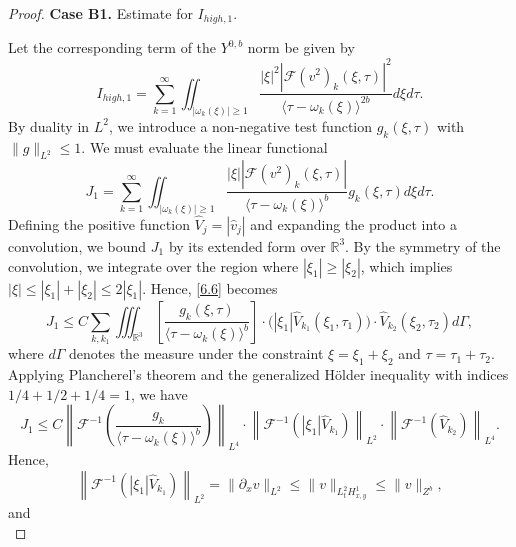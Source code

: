 \documentclass[11pt]{article}
\numberwithin{equation}{section}
\begin{document}
\begin{proof}
\textbf{Case B1.} Estimate for $I_{high,1}$.

Let the corresponding term of the $Y^{0,b}$ norm be given by
\begin{equation}
    I_{high,1} = \sum_{k=1}^{\infty} \iint_{|\omega_{k}(\xi)| \ge 1} \frac{|\xi|^{2}
    |\mathcal{F}(v^{2})_{k}(\xi,\tau)|^{2}}{\langle \tau - \omega_{k}(\xi)\rangle^{2b}} d\xi d\tau.
\end{equation}
By duality in $L^2$, we introduce a non-negative test function $g_{k}(\xi,\tau)$ with $\|g\|_{L^2} \le 1$.
We must evaluate the linear functional
\begin{equation}\label{6.6}
    J_{1} = \sum_{k=1}^{\infty} \iint_{|\omega_{k}(\xi)|\geq 1} \frac{|\xi| |\mathcal{F}(v^{2})_k(\xi,\tau)|}{\langle \tau
    - \omega_{k}(\xi)\rangle^{b}} g_{k}(\xi,\tau) d\xi d\tau.
\end{equation}
Defining the positive function $\widehat{V}_{j} = |\widehat{v}_{j}|$
and expanding the product into a convolution, we bound $J_{1}$ by
its extended form over $\mathbb{R}^{3}$. By the symmetry of the
convolution, we integrate over the region where $|\xi_{1}| \ge
|\xi_{2}|$, which implies $|\xi| \le |\xi_{1}| + |\xi_{2}| \le
2|\xi_{1}|$. Hence, \eqref{6.6} becomes
\begin{equation}
    J_{1} \leq C\sum_{k,k_{1}} \iiint_{\mathbb{R}^{3}} \left[ \frac{g_{k}(\xi,\tau)}{\langle \tau -
    \omega_{k}(\xi)\rangle^{b}} \right] \cdot \Big( |\xi_{1}| \widehat{V}_{k_{1}}(\xi_{1},\tau_{1}) \Big) \cdot \widehat{V}_{k_{2}}(\xi_{2},\tau_{2}) d\Gamma,
\end{equation}
where $d\Gamma$ denotes the measure under the constraint $\xi =
\xi_{1}+\xi_{2}$ and $\tau = \tau_{1}+\tau_{2}$. Applying
Plancherel's theorem and the generalized Hölder inequality with
indices $1/4 + 1/2 + 1/4 = 1$, we have
\begin{equation}
J_{1} \leq C\left\|\mathcal{F}^{-1}\left(\frac{g_{k}}{\langle \tau - \omega_{k}(\xi)
\rangle^{b}}\right)\right\|_{L^{4}} \cdot \left\|\mathcal{F}^{-1}\left(|\xi_1|
\widehat{V}_{k_{1}}\right)\right\|_{L^{2}} \cdot \left\|\mathcal{F}^{-1}\left(\widehat{V}_{k_{2}}\right)\right\|_{L^{4}}.
\end{equation}
Hence,
\begin{equation}
\left\|\mathcal{F}^{-1}\left(|\xi_1| \widehat{V}_{k_{1}}\right)\right\|_{L^{2}}= \|\partial_{x} v\|_{L^{2}} \leq \|v\|_{L^{2}_{t} H^{1}_{x,y}} \leq \|v\|_{Z^{b}},
\end{equation}
and
\begin{equation}

\end{equation}
\end{proof}
\end{document}
